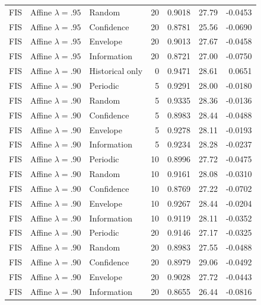 \begin{longtable}{lllrrrr}
FIS & Affine $\lambda=.95$ & Random & 20 & 0.9018 & 27.79 & -0.0453 \\
FIS & Affine $\lambda=.95$ & Confidence & 20 & 0.8781 & 25.56 & -0.0690 \\
FIS & Affine $\lambda=.95$ & Envelope & 20 & 0.9013 & 27.67 & -0.0458 \\
FIS & Affine $\lambda=.95$ & Information & 20 & 0.8721 & 27.00 & -0.0750 \\
FIS & Affine $\lambda=.90$ & Historical only & 0 & 0.9471 & 28.61 & 0.0651 \\
FIS & Affine $\lambda=.90$ & Periodic & 5 & 0.9291 & 28.00 & -0.0180 \\
FIS & Affine $\lambda=.90$ & Random & 5 & 0.9335 & 28.36 & -0.0136 \\
FIS & Affine $\lambda=.90$ & Confidence & 5 & 0.8983 & 28.44 & -0.0488 \\
FIS & Affine $\lambda=.90$ & Envelope & 5 & 0.9278 & 28.11 & -0.0193 \\
FIS & Affine $\lambda=.90$ & Information & 5 & 0.9234 & 28.28 & -0.0237 \\
FIS & Affine $\lambda=.90$ & Periodic & 10 & 0.8996 & 27.72 & -0.0475 \\
FIS & Affine $\lambda=.90$ & Random & 10 & 0.9161 & 28.08 & -0.0310 \\
FIS & Affine $\lambda=.90$ & Confidence & 10 & 0.8769 & 27.22 & -0.0702 \\
FIS & Affine $\lambda=.90$ & Envelope & 10 & 0.9267 & 28.44 & -0.0204 \\
FIS & Affine $\lambda=.90$ & Information & 10 & 0.9119 & 28.11 & -0.0352 \\
FIS & Affine $\lambda=.90$ & Periodic & 20 & 0.9146 & 27.17 & -0.0325 \\
FIS & Affine $\lambda=.90$ & Random & 20 & 0.8983 & 27.55 & -0.0488 \\
FIS & Affine $\lambda=.90$ & Confidence & 20 & 0.8979 & 29.06 & -0.0492 \\
FIS & Affine $\lambda=.90$ & Envelope & 20 & 0.9028 & 27.72 & -0.0443 \\
FIS & Affine $\lambda=.90$ & Information & 20 & 0.8655 & 26.44 & -0.0816 \\
\end{longtable}\normalsize

